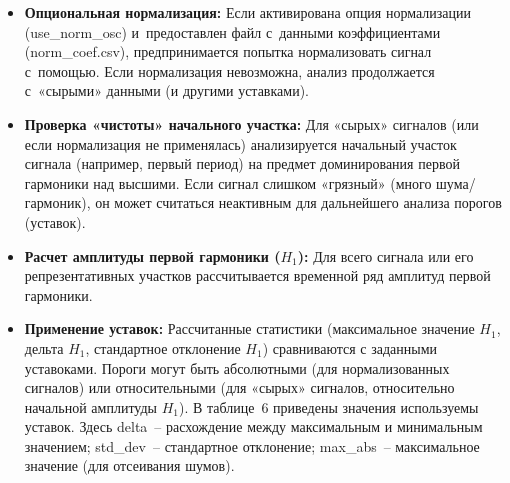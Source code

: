 \begin{itemize}
  \item \textbf{Опциональная нормализация:} Если активирована опция нормализации (use\_\allowbreak norm\_\allowbreak osc) и~предоставлен файл с~данными коэффициентами (norm\_\allowbreak coef.csv), предпринимается попытка нормализовать сигнал с~помощью. Если нормализация невозможна, анализ продолжается с~«сырыми» данными (и другими уставками).
  \item \textbf{Проверка «чистоты» начального участка:} Для «сырых» сигналов (или если нормализация не применялась) анализируется начальный участок сигнала (например, первый период) на предмет доминирования первой гармоники над высшими. Если сигнал слишком «грязный» (много шума/гармоник), он может считаться неактивным для дальнейшего анализа порогов (уставок).
  \item \textbf{Расчет амплитуды первой гармоники ($H_1$):} Для всего сигнала или его репрезентативных участков рассчитывается временной ряд амплитуд первой гармоники.
  \item \textbf{Применение уставок:} Рассчитанные статистики (максимальное значение $H_1$, дельта $H_1$, стандартное отклонение $H_1$) сравниваются с заданными уставоками. Пороги могут быть абсолютными (для нормализованных сигналов) или относительными (для «сырых» сигналов, относительно начальной амплитуды $H_1$). В таблице~6 приведены значения используемы уставок. Здесь delta~-- расхождение между максимальным и минимальным значением; std\_\allowbreak dev~-- стандартное отклонение; max\_\allowbreak abs~-- максимальное значение (для отсеивания шумов).
\end{itemize}

